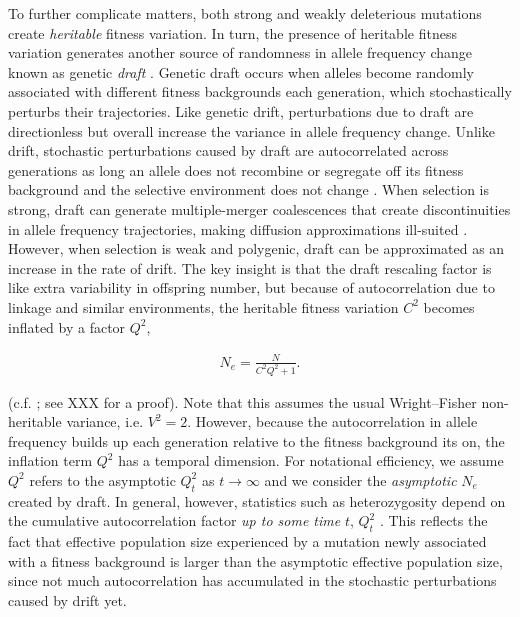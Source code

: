\documentclass[11pt]{article}
\begin{document}
To further complicate matters, both strong and weakly deleterious mutations
create \emph{heritable} fitness variation. In turn, the presence of heritable
fitness variation generates another source of randomness in allele frequency
change known as genetic \emph{draft} \parencite{Neher2013-dz}. Genetic draft
occurs when alleles become randomly associated with different fitness
backgrounds each generation, which stochastically perturbs their trajectories.
Like genetic drift, perturbations due to draft are directionless but overall
increase the variance in allele frequency change. Unlike drift, stochastic
perturbations caused by draft are autocorrelated across generations as long an
allele does not recombine or segregate off its fitness background and the
selective environment does not change
\parencite{Robertson1961-ho,Santiago1995-hx,Buffalo2019-qs}. When selection is
strong, draft can generate multiple-merger coalescences that create
discontinuities in allele frequency trajectories, making diffusion
approximations ill-suited \parencite{Gillespie2000-mh,Der2011-it,Neher2013-dz}.
However, when selection is weak and polygenic, draft can be approximated as an
increase in the rate of drift. The key insight is that the draft rescaling
factor is like extra variability in offspring number, but because of
autocorrelation due to linkage and similar environments, the heritable fitness
variation $C^2$ becomes inflated by a factor $Q^2$,

\begin{align}
    N_e = \frac{N}{C^2 Q^2 + 1}.
\end{align}

(c.f. \cite{Robertson1961-ho,Santiago1995-hx}; see XXX for a proof). Note that
this assumes the usual Wright--Fisher non-heritable variance, i.e. $V^2=2$.
However, because the autocorrelation in allele frequency builds up each
generation relative to the fitness background its on, the inflation term $Q^2$
has a temporal dimension. For notational efficiency, we assume $Q^2$ refers to
the asymptotic $Q_t^2$ as $t \to \infty$ and we consider the \emph{asymptotic}
$N_e$ created by draft. In general, however, statistics such as heterozygosity
depend on the cumulative autocorrelation factor \emph{up to some time} $t$,
$Q_t^2$ \parencite[p. 2111]{Santiago1998-bs}. This reflects the fact that
effective population size experienced by a mutation newly associated with a
fitness background is larger than the asymptotic effective population size,
since not much autocorrelation has accumulated in the stochastic perturbations
caused by drift yet. 
\end{document}
